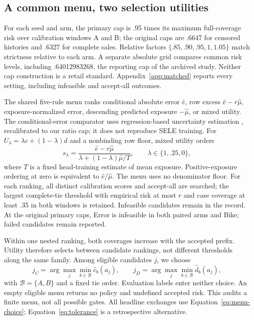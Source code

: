 \documentclass{article}
\begin{document}
\subsection{A common menu, two selection utilities}
\label{sec:choice-design}
For each seed and arm, the primary cap is .95 times its maximum full-coverage risk over calibration windows A and B; the original caps are .6647 for censored histories and .6327 for complete sales. Relative factors $\{.85,.90,.95,1,1.05\}$ match strictness relative to each arm. A separate absolute grid compares common risk levels, including .64012983268, the reporting cap of the archived study. Neither cap construction is a retail standard. Appendix~\ref{app:matched} reports every setting, including infeasible and accept-all outcomes.

The shared five-rule menu ranks conditional absolute error $\hat e$, row excess $\hat e-r\hat\mu$, exposure-normalized error, descending predicted exposure $-\hat\mu$, or mixed utility. The conditional-error comparator uses regression-based uncertainty estimation \citep{franc2023reject}, recalibrated to our ratio cap; it does not reproduce SELE training. For $U_\lambda=\lambda c+(1-\lambda)d$ and a nonbinding row floor, mixed utility orders
\begin{equation}
 s_\lambda=\frac{\hat e-r\hat\mu}{\lambda+(1-\lambda)\hat\mu/T},\qquad
 \lambda\in\{1,.25,0\},
 \label{eq:mixed}
\end{equation}
where $T$ is a fixed head-training estimate of mean exposure. Positive-exposure ordering at zero is equivalent to $\hat e/\hat\mu$. The menu uses no denominator floor. For each ranking, all distinct calibration scores and accept-all are searched; the largest complete-tie threshold with empirical risk at most $r$ and case coverage at least .35 in both windows is retained. Infeasible candidates remain in the record. At the original primary caps, Error is infeasible in both paired arms and Bike; failed candidates remain reported.

Within one nested ranking, both coverages increase with the accepted prefix. Utility therefore selects between candidate rankings, not different thresholds along the same family. Among eligible candidates $j$, we choose
\begin{equation}
 j_C=\arg\max_j\min_{b\in\mathcal B}\widehat c_b(a_j),
 \qquad j_D=\arg\max_j\min_{b\in\mathcal B}\widehat d_b(a_j),
 \label{eq:menu-choice}
\end{equation}
with $\mathcal B=\{A,B\}$ and a fixed tie order. Evaluation labels enter neither choice. An empty eligible menu returns no policy and undefined accepted risk. This audits a finite menu, not all possible gates. All headline exchanges use Equation~\eqref{eq:menu-choice}; Equation~\eqref{eq:tolerance} is a retrospective alternative.
\end{document}
